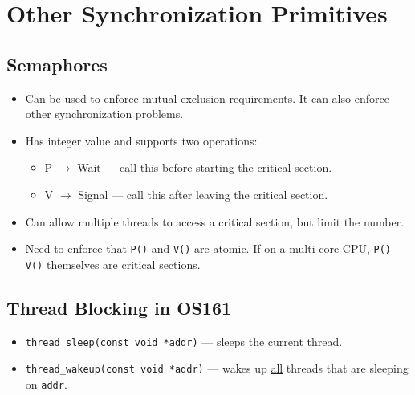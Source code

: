 \documentclass[12pt]{article}
\begin{document}
\section{Other Synchronization Primitives}

\subsection{Semaphores}

\begin{itemize}
    \item Can be used to enforce mutual exclusion requirements. It can also
        enforce other synchronization problems.
    \item Has integer value and supports two operations:
        \begin{itemize}
            \item P $\to$ Wait --- call this before starting the critical
                section.
            \item V $\to$ Signal --- call this after leaving the critical
                section.
        \end{itemize}
    \item Can allow multiple threads to access a critical section, but limit the
        number.
    \item Need to enforce that \texttt{P()} and \texttt{V()} are atomic. If on a multi-core CPU,
        \texttt{P()} \texttt{V()} themselves are critical sections.
\end{itemize}

\subsection{Thread Blocking in OS161}
\begin{itemize}
    \item \texttt{thread\_sleep(const void *addr)} --- sleeps the current thread.
    \item \texttt{thread\_wakeup(const void *addr)} --- wakes up \underline{all}
        threads that are sleeping on \texttt{addr}.
\end{itemize}
\end{document}

